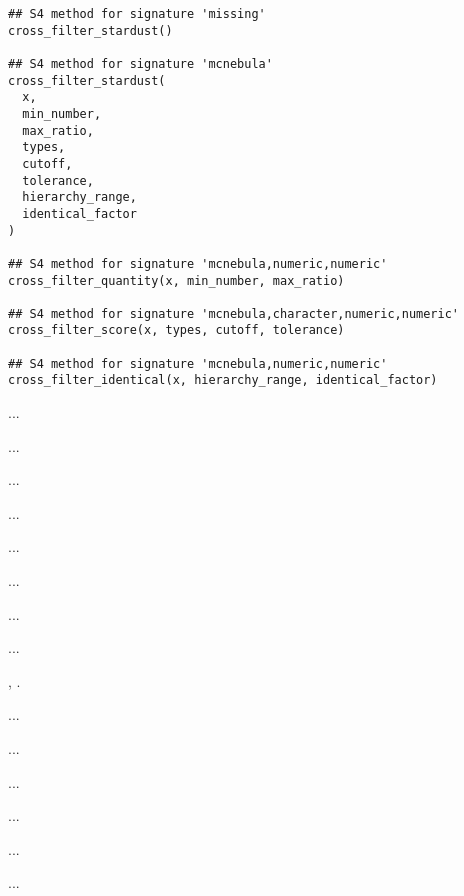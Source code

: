 \documentclass[letterpaper]{book}
\begin{document}
%
\begin{Usage}
\begin{verbatim}
## S4 method for signature 'missing'
cross_filter_stardust()

## S4 method for signature 'mcnebula'
cross_filter_stardust(
  x,
  min_number,
  max_ratio,
  types,
  cutoff,
  tolerance,
  hierarchy_range,
  identical_factor
)

## S4 method for signature 'mcnebula,numeric,numeric'
cross_filter_quantity(x, min_number, max_ratio)

## S4 method for signature 'mcnebula,character,numeric,numeric'
cross_filter_score(x, types, cutoff, tolerance)

## S4 method for signature 'mcnebula,numeric,numeric'
cross_filter_identical(x, hierarchy_range, identical_factor)
\end{verbatim}
\end{Usage}
%
\begin{Arguments}
\begin{ldescription}
\item[\code{x}] ...

\item[\code{min\_number}] ...

\item[\code{max\_ratio}] ...

\item[\code{types}] ...

\item[\code{cutoff}] ...

\item[\code{tolerance}] ...

\item[\code{hierarchy\_range}] ...

\item[\code{identical\_factor}] ...

, .
\end{ldescription}
\end{Arguments}
%
\begin{Details}\relax
...

...

...
\end{Details}
%
\begin{Value}
...

...

...
\end{Value}
%
\begin{SeeAlso}\relax
{}

\end{SeeAlso}
\end{document}
